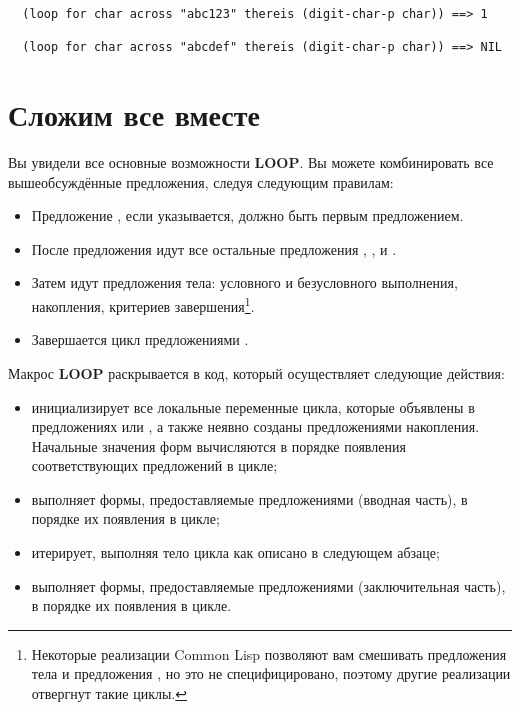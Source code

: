\begin{lstlisting}
  (loop for char across "abc123" thereis (digit-char-p char)) ==> 1

  (loop for char across "abcdef" thereis (digit-char-p char)) ==> NIL
\end{lstlisting}

\section{Сложим все вместе}

Вы увидели все основные возможности \textbf{LOOP}. Вы можете комбинировать все вышеобсуждённые
предложения, следуя следующим правилам:

\begin{itemize}
\item Предложение , если указывается, должно быть первым предложением.
\item После предложения  идут все остальные предложения ,
  ,  и .
\item Затем идут предложения тела: условного и безусловного выполнения, накопления,
  критериев завершения\footnote{Некоторые реализации Common Lisp позволяют вам смешивать
    предложения тела и предложения , но это не специфицировано, поэтому другие
    реализации отвергнут такие циклы.}.
\item Завершается цикл предложениями .
\end{itemize}

Макрос \textbf{LOOP} раскрывается в код, который осуществляет следующие действия:

\begin{itemize}
\item инициализирует все локальные переменные цикла, которые объявлены в предложениях
   или , а также неявно созданы предложениями накопления. Начальные
  значения форм вычисляются в порядке появления соответствующих предложений в цикле;
\item выполняет формы, предоставляемые предложениями  (вводная часть), в
  порядке их появления в цикле;
\item итерирует, выполняя тело цикла как описано в следующем абзаце;
\item выполняет формы, предоставляемые предложениями  (заключительная
  часть), в порядке их появления в цикле.
\end{itemize}

